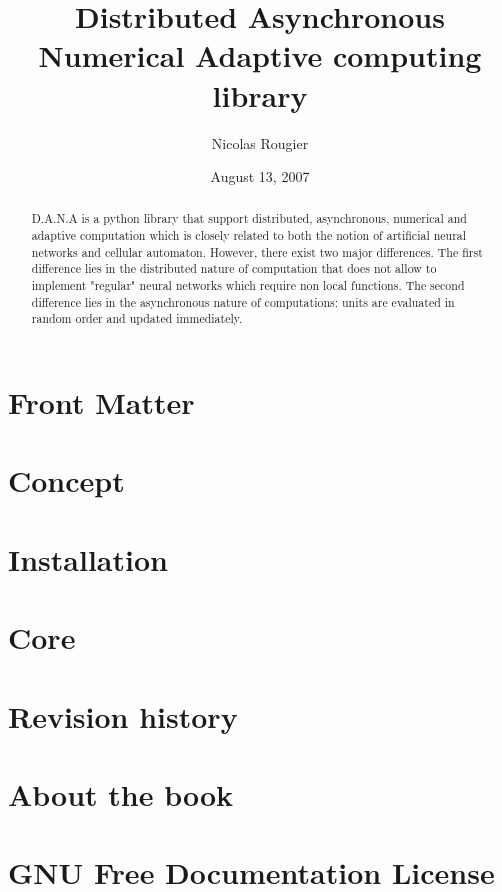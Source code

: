 \documentclass{manual}
\title{Distributed Asynchronous Numerical Adaptive computing library}
\author{Nicolas Rougier}
\date{August 13, 2007}
\begin{document}
\maketitle

\ifhtml
\chapter*{Front Matter\label{front}}
\fi


\begin{abstract}
\noindent
D.A.N.A is a python library that support distributed, asynchronous, numerical and
adaptive computation which is closely related to both the notion of artificial
neural networks and cellular automaton. However, there exist two major
differences. The first difference lies in the distributed nature of computation
that does not allow to implement "regular" neural networks which require non
local functions. The second difference lies in the asynchronous nature of
computations: units are evaluated in random order and updated immediately.
\end{abstract}

\tableofcontents

\chapter{Concept}


\chapter{Installation}


\chapter{Core}


\appendix

\chapter{Revision history}


\chapter{About the book}


\chapter{GNU Free Documentation License \label{License}}



%
%
%

\end{document}
